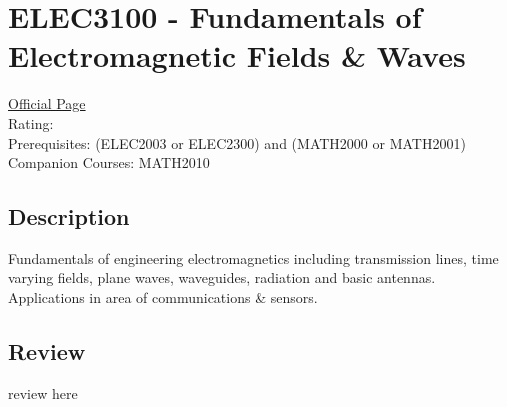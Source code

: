 \hypertarget{ELEC3100}{\section{ELEC3100 - Fundamentals of Electromagnetic Fields \& Waves}}

\large
\textcolor{turbo_purple}{\href{https://my.uq.edu.au/programs-courses/course.html?course_code=ELEC3100}{Official Page}} \\
Rating: \cstar\cstar\cstar\cstar\ostar \\
Prerequisites: (ELEC2003 or ELEC2300) and (MATH2000 or MATH2001) \\
Companion Courses: MATH2010

\normalsize
\subsection*{Description}
Fundamentals of engineering electromagnetics including transmission lines, time varying fields, plane waves, waveguides, radiation and basic antennas.
Applications in area of communications \& sensors.

\subsection*{Review}
review here

